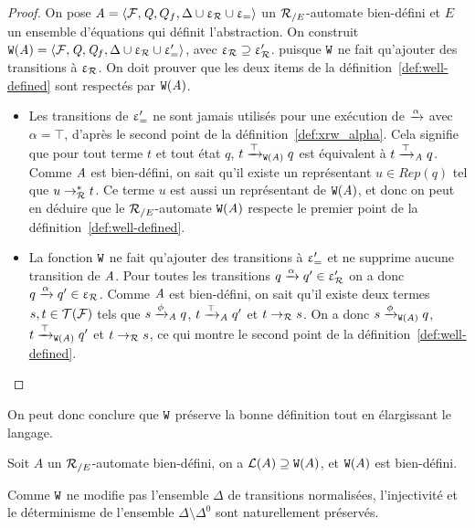 \begin{proof}
  On pose $\mathit A = \langle \mathcal{F}, \mathit Q, Q_f, \Delta \cup \upvarepsilon_{\mathcal R} \cup \upvarepsilon_{=}\rangle$ un ${\mathcal R_{/E}}$-automate bien-défini et
  $E$ un ensemble d'équations qui définit l'abstraction.
  On construit $\mathtt{W}(\mathit A) = \langle \mathcal{F}, \mathit Q, \mathit Q_f, \Delta \cup \upvarepsilon_{\mathcal R} \cup \upvarepsilon_{=}'\rangle$, avec $\upvarepsilon_{\mathcal R} \supseteq \upvarepsilon_{\mathcal R}'$.
  puisque $\mathtt{W}$ ne fait qu'ajouter des transitions à $\upvarepsilon_{\mathcal R}$. On doit prouver que les deux items de la définition~\ref{def:well-defined}
  sont respectés par $\mathtt{W}(\mathit A)$.
  \begin{itemize}
  \item 
    Les transitions de $\upvarepsilon_{=}'$ ne sont jamais utilisés pour une exécution de $\xrightarrow{\alpha}$ avec $\alpha = \top$,
    d'après le second point de la définition~\ref{def:xrw_alpha}.
    Cela signifie que pour tout terme $t$ et tout état $q$, $t \xrightarrow{\top}_{\mathtt{W}(\mathit A)} q$ est équivalent à $t \xrightarrow{\top}_\mathit A q$.
    Comme $\mathit A$ est bien-défini, on sait qu'il existe un représentant $u \in Rep(q)$ tel que $u \rightarrow^*_\mathcal R t$.
    Ce terme $u$ est aussi un représentant de $\mathtt{W}(\mathit A)$, et donc on peut en déduire que le ${\mathcal R_{/E}}$-automate $\mathtt{W}(\mathit A)$ 
    respecte le premier point de la définition~\ref{def:well-defined}.

  \item
    La fonction $\mathtt{W}$ ne fait qu'ajouter des transitions à $\upvarepsilon_{=}'$ et ne supprime aucune transition de $\mathit A$.
    Pour toutes les transitions $q \xrightarrow{\alpha} q' \in \upvarepsilon_{\mathcal R}'$ on a donc $q \xrightarrow{\alpha} q' \in \upvarepsilon_{\mathcal R}$.
    Comme $\mathit A$ est bien-défini, on sait qu'il existe deux termes $s,t\in \mathcal{T(F)}$ tels que
    $s\xrightarrow{\phi}_\mathit A q$, $t\xrightarrow{\top}_\mathit A q'$ et $t \rightarrow_\mathcal R s$.
    On a donc $s\xrightarrow{\phi}_{\mathtt{W}(\mathit A)} q$, $t\xrightarrow{\top}_{\mathtt{W}(\mathit A)} q'$ et $t \rightarrow_\mathcal R s$, ce qui montre le second point
    de la définition~\ref{def:well-defined}.
  \end{itemize}
\end{proof}

On peut donc conclure que $\mathtt{W}$ préserve la bonne définition tout en élargissant le langage.

\begin{property}
  \label{thm:W}
  Soit $A$ un ${\mathcal R_{/E}}$-automate bien-défini, on a $\mathcal{L}(A) \supseteq \mathtt{W}(A)$,
  et $\mathtt{W}(A)$ est bien-défini.
\end{property}


\begin{remark}
  Comme $\mathtt{W}$ ne modifie pas l'ensemble $\Delta$ de transitions normalisées,   
  l'injectivité et le déterminisme de l'ensemble $\Delta \setminus \Delta^0$ sont naturellement
  préservés. 
\end{remark}

